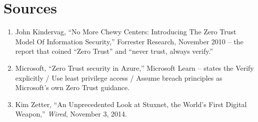 \section*{Sources}
\begin{enumerate}[label=\lbrack\arabic*\rbrack, leftmargin=2.2em]
\item {}John Kindervag, ``No More Chewy Centers: Introducing The Zero Trust Model
Of Information Security,'' Forrester Research, November 2010 -- the report that coined ``Zero
Trust'' and ``never trust, always verify.''
\item {}Microsoft, ``Zero Trust security in Azure,'' Microsoft Learn -- states the
Verify explicitly / Use least privilege access / Assume breach principles as Microsoft's own
Zero Trust guidance.
\item {}Kim Zetter, ``An Unprecedented Look at Stuxnet, the World's First Digital
Weapon,'' \emph{Wired}, November 3, 2014.
\end{enumerate}
